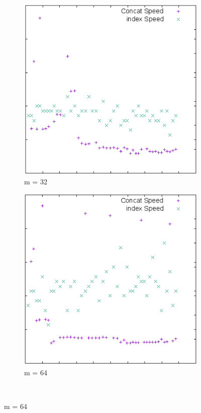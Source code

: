 \documentclass[11pt,a4paper,oneside]{article}
\begin{document}
\begin{figure}[H]
    \begin{subfigure}[b]{0.3\textwidth}
        \includegraphics[width=\textwidth]{img/plot32.png}
        \caption{m = 32}
    \end{subfigure}
    \begin{subfigure}[b]{0.3\textwidth}
        \includegraphics[width=\textwidth]{img/plot64.png}
        \caption{m = 64}
    \end{subfigure}
    ~ %
\end{figure}
\end{document}

